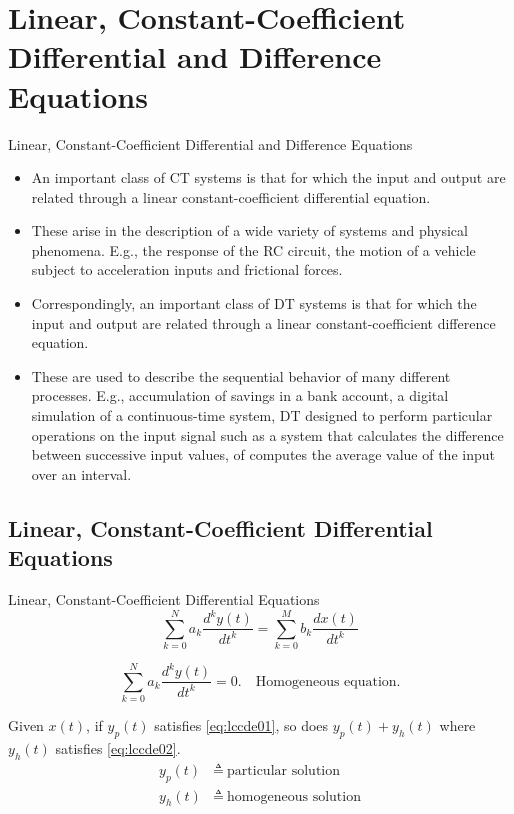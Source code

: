 \section{Linear, Constant-Coefficient Differential and Difference Equations}
\begin{frame}{Linear, Constant-Coefficient Differential and Difference Equations}
    \begin{itemize}
      \item An important class of CT systems is that for which the input and output are related through a linear constant-coefficient differential equation.
      \item These arise in the description of a wide variety of systems and physical phenomena. E.g., the response of the RC circuit, the motion of a vehicle subject to acceleration inputs and frictional forces.
      \item Correspondingly, an important class of DT systems is that for which the input and output are related through a linear constant-coefficient difference equation.
      \item These are used to describe the sequential behavior of many different processes. E.g., accumulation of savings in a bank account, a digital simulation of a continuous-time system, DT designed to perform particular operations on the input signal such as a system that calculates the difference between successive input values, of computes the average value of the input over an interval.
    \end{itemize}
\end{frame}

\subsection{Linear, Constant-Coefficient Differential Equations}

\begin{frame}{Linear, Constant-Coefficient Differential Equations}
    \begin{equation}\label{eq:lccde01}
        \sum_{k=0}^{N}a_k \frac{d^ky(t)}{dt^k} = \sum_{k=0}^{M}b_k \frac{dx(t)}{dt^k}
    \end{equation}

    \begin{equation}\label{eq:lccde02}
        \sum_{k=0}^{N}a_k \frac{d^ky(t)}{dt^k} = 0.\quad \text{Homogeneous equation.}
    \end{equation}

     Given $x(t)$, if $y_p(t)$ satisfies \ref{eq:lccde01}, so does $y_p(t) + y_h(t)$ where $y_h(t)$ satisfies \ref{eq:lccde02}.
     \begin{align*}
       y_p(t) &\triangleq~\text{particular solution} \\
       y_h(t) &\triangleq~\text{homogeneous solution} \\
     \end{align*}
\end{frame}




